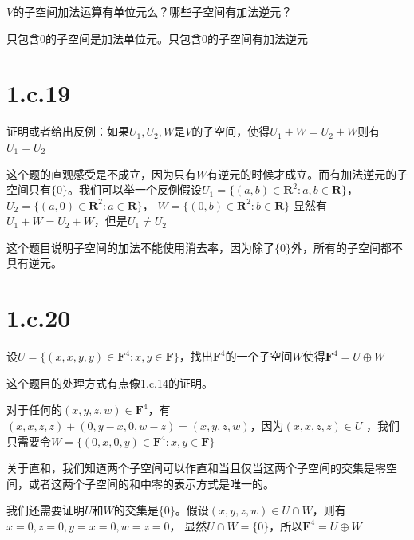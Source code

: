 \documentclass[10pt,a4paper,UTF8]{article}
\begin{document}
\begin{problem}
\(V\)的子空间加法运算有单位元么？哪些子空间有加法逆元？
\end{problem}

\begin{answer}
只包含\(0\)的子空间是加法单位元。只包含\(0\)的子空间有加法逆元
\end{answer}
\section*{1.c.19}
\label{sec:org4cf5a87}


\begin{problem}
证明或者给出反例：如果\(U_{1},U_{2},W\)是\(V\)的子空间，使得\(U_{1} + W = U_{2} + W\)则有\(U_{1} = U_{2}\)
\end{problem}

\begin{answer}
这个题的直观感受是不成立，因为只有\(W\)有逆元的时候才成立。而有加法逆元的子空间只有\(\{0\}\)。我们可以举一个反例假设\(U_{1} = \{(a,b)\in \mathbf{R}^{2}:a,b\in \mathbf{R}\}\)，  \(U_{2} = \{(a,0)\in \mathbf{R}^{2}:a\in \mathbf{R}\}\)， \(W = \{(0,b)\in \mathbf{R}^{2}:b\in \mathbf{R}\}\) 显然有\(U_{1} + W = U_{2} + W\)，但是\(U_{1}\neq U_{2}\)

这个题目说明子空间的加法不能使用消去率，因为除了\(\{0\}\)外，所有的子空间都不具有逆元。
\end{answer}
\section*{1.c.20}
\label{sec:org074ab88}



\begin{problem}
设\(U=\{(x,x,y,y)\in \mathbf{F}^{4}:x,y\in \mathbf{F}\}\)，找出\(\mathbf{F}^{4}\)的一个子空间\(W\)使得\(\mathbf{F}^{4} = U\oplus W\)
\end{problem}

\begin{answer}
这个题目的处理方式有点像1.c.14的证明。

对于任何的\((x,y,z,w)\in \mathbf{F}^{4}\)，有\((x,x,z,z) + (0,y-x,0,w-z) = (x,y,z,w)\)，因为\((x,x,z,z) \in U\) ，我们只需要令\(W = \{(0,x,0,y)\in \mathbf{F}^{4}:x,y\in \mathbf{F} \}\)

关于直和，我们知道两个子空间可以作直和当且仅当这两个子空间的交集是零空间，或者这两个子空间的和中零的表示方式是唯一的。

我们还需要证明\(U\)和\(W\)的交集是\(\{0\}\)。假设\((x,y,z,w)\in U\cap W\)，则有\(x=0,z=0,y=x=0,w=z=0\)， 显然\(U\cap W = \{0\}\)，所以\(\mathbf{F}^{4} = U \oplus W\)
\end{answer}
\end{document}
